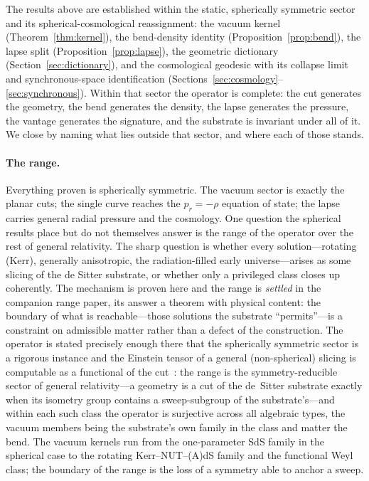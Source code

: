 \documentclass[11pt,a4paper]{article}
\theoremstyle{definition}
\begin{document}
The results above are established within the static, spherically symmetric sector and its spherical-cosmological reassignment: the vacuum kernel (Theorem~\ref{thm:kernel}), the bend-density identity (Proposition~\ref{prop:bend}), the lapse split (Proposition~\ref{prop:lapse}), the geometric dictionary (Section~\ref{sec:dictionary}), and the cosmological geodesic with its collapse limit and synchronous-space identification (Sections~\ref{sec:cosmology}--\ref{sec:synchronous}). Within that sector the operator is complete: the cut generates the geometry, the bend generates the density, the lapse generates the pressure, the vantage generates the signature, and the substrate is invariant under all of it. We close by naming what lies outside that sector, and where each of those stands.

\paragraph{The range.} Everything proven is spherically symmetric. The vacuum sector is exactly the planar cuts; the single curve reaches the $p_{r}=-\rho$ equation of state; the lapse carries general radial pressure and the cosmology. One question the spherical results place but do not themselves answer is the range of the operator over the rest of general relativity. The sharp question is whether every solution---rotating (Kerr), generally anisotropic, the radiation-filled early universe---arises as some slicing of the de Sitter substrate, or whether only a privileged class closes up coherently. The mechanism is proven here and the range is \emph{settled} in the companion range paper, its answer a theorem with physical content: the boundary of what is reachable---those solutions the substrate ``permits''---is a constraint on admissible matter rather than a defect of the construction. The operator is stated precisely enough there that the spherically symmetric sector is a rigorous instance and the Einstein tensor of a general (non-spherical) slicing is computable as a functional of the cut~\cite{JanzenRange}: the range is the symmetry-reducible sector of general relativity---a geometry is a cut of the de~Sitter substrate exactly when its isometry group contains a sweep-subgroup of the substrate's---and within each such class the operator is surjective across all algebraic types, the vacuum members being the substrate's own family in the class and matter the bend. The vacuum kernels run from the one-parameter SdS family in the spherical case to the rotating Kerr--NUT--(A)dS family and the functional Weyl class; the boundary of the range is the loss of a symmetry able to anchor a sweep.
\end{document}
